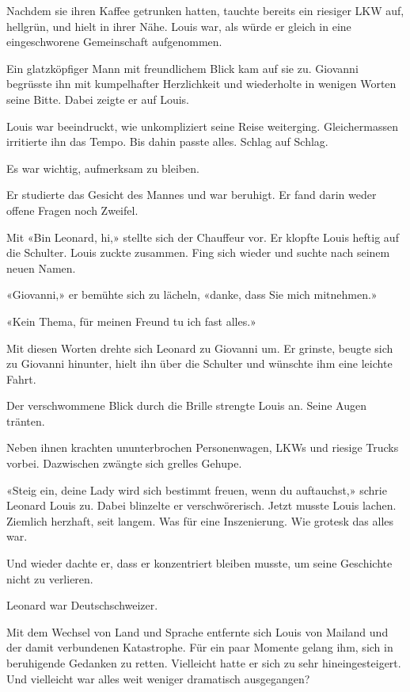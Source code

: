 Nachdem sie ihren Kaffee getrunken hatten, tauchte bereits ein riesiger
LKW auf, hellgrün, und hielt in ihrer Nähe. Louis war, als würde er
gleich in eine eingeschworene Gemeinschaft aufgenommen.

Ein glatzköpfiger Mann mit freundlichem Blick kam auf sie zu. Giovanni
begrüsste ihn mit kumpelhafter Herzlichkeit und wiederholte in wenigen
Worten seine Bitte. Dabei zeigte er auf Louis.

Louis war beeindruckt, wie unkompliziert seine Reise weiterging.
Gleichermassen irritierte ihn das Tempo. Bis dahin passte alles. Schlag
auf Schlag.

Es war wichtig, aufmerksam zu bleiben.

Er studierte das Gesicht des Mannes und war beruhigt. Er fand darin
weder offene Fragen noch Zweifel.

Mit «Bin Leonard, hi,» stellte sich der Chauffeur vor. Er klopfte Louis
heftig auf die Schulter. Louis zuckte zusammen. Fing sich wieder und
suchte nach seinem neuen Namen.

«Giovanni,» er bemühte sich zu lächeln, «danke, dass Sie mich
mitnehmen.»

«Kein Thema, für meinen Freund tu ich fast alles.»

Mit diesen Worten drehte sich Leonard zu Giovanni um. Er grinste, beugte
sich zu Giovanni hinunter, hielt ihn über die Schulter und wünschte ihm
eine leichte Fahrt.

Der verschwommene Blick durch die Brille strengte Louis an. Seine Augen
tränten.

Neben ihnen krachten ununterbrochen Personenwagen, LKWs und riesige
Trucks vorbei. Dazwischen zwängte sich grelles Gehupe.

«Steig ein, deine Lady wird sich bestimmt freuen, wenn du auftauchst,»
schrie Leonard Louis zu. Dabei blinzelte er verschwörerisch. Jetzt
musste Louis lachen. Ziemlich herzhaft, seit langem. Was für eine
Inszenierung. Wie grotesk das alles war.

Und wieder dachte er, dass er konzentriert bleiben musste, um seine
Geschichte nicht zu verlieren.

Leonard war Deutschschweizer.

Mit dem Wechsel von Land und Sprache entfernte sich Louis von Mailand
und der damit verbundenen Katastrophe. Für ein paar Momente gelang ihm,
sich in beruhigende Gedanken zu retten. Vielleicht hatte er sich zu sehr
hineingesteigert. Und vielleicht war alles weit weniger dramatisch
ausgegangen?

